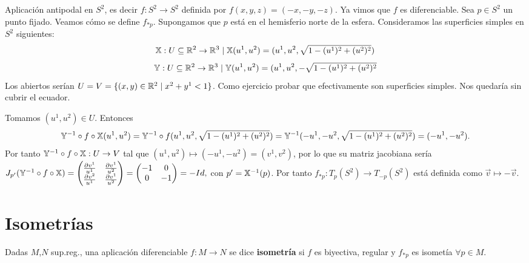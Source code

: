 \documentclass[twoside]{report}
\begin{document}
\begin{ej}
Aplicación antipodal en $S^2$, es decir $f:S^2\to S^2$ definida por $f(x,y,z)=(-x,-y,-z)$. Ya vimos que $f$ es diferenciable. Sea $p\in S^2$ un punto fijado. Veamos cómo se define $f_{*p}$. Supongamos que $p$ está en el hemisferio norte de la esfera. Consideramos las superficies simples en $S^2$ siguientes:
$$\mathbb{X}:U\subseteq\mathbb{R}^2\to\mathbb{R}^3\mid \mathbb{X}(u^1,u^2)=(u^1,u^2,\sqrt{1-(u^1)^2+(u^2)^2})$$ 
$$\mathbb{Y}:U\subseteq\mathbb{R}^2\to\mathbb{R}^3\mid \mathbb{Y}(u^1,u^2)=(u^1,u^2,-\sqrt{1-(u^1)^2+(u^2)^2}$$
Los abiertos serían $U=V=\{(x,y)\in\mathbb{R}^2\mid x^2+y^1<1\}$. Como ejercicio probar que efectivamente son superficies simples. Nos quedaría sin cubrir el ecuador.

Tomamos $(u^1,u^2)\in U$. Entonces $$\mathbb{Y}^{-1}\circ f\circ \mathbb{X}(u^1,u^2)=\mathbb{Y}^{-1}\circ f(u^1,u^2,\sqrt{1-(u^1)^2+(u^2)^2})=\mathbb{Y}^{-1}(-u^1,-u^2,\sqrt{1-(u^1)^2+(u^2)^2})=(-u^1,-u^2).$$
Por tanto $\mathbb{Y}^{-1}\circ f\circ \mathbb{X}:U\to V$ tal que $(u^1,u^2)\mapsto (-u^1,-u^2)=(v^1,v^2)$, por lo que su matriz jacobiana sería
$J_{p'}(\mathbb{Y}^{-1}\circ f\circ \mathbb{X})=\begin{pmatrix}
\frac{\partial v^1}{u^1}	& \frac{\partial v^1}{u^2}\\
\frac{\partial v^2}{u^1}	& \frac{\partial v^1}{u^2}
\end{pmatrix}=\begin{pmatrix}
-1	& 0\\
0	& -1
\end{pmatrix}=-Id,$ con $p'=\mathbb{X}^{-1}(p)$. Por tanto $f_{*p}:T_p(S^2)\to T_{-p}(S^2)$ está definida como $\vec{v}\mapsto -\vec{v}$.
\end{ej}

\section{Isometrías}

\begin{defi}
 Dadas $M$,$N$ sup.reg., una aplicación diferenciable $f:M \longrightarrow N$ se dice \textbf{isometría} si $f$ es biyectiva, regular y  $f_{*p}$ es isometía $\forall p \in M$.
\end{defi}
\end{document}
